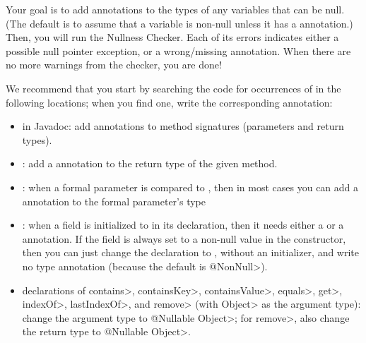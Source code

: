 Your goal is to add  annotations
to the types of any variables that can be null.  (The default is to assume
that a variable is non-null unless it has a  annotation.)
Then, you will run the Nullness Checker.  Each of its errors indicates
either a possible null pointer exception, or a wrong/missing annotation.
When there are no more warnings from the checker, you are done!

We recommend that you start by searching the code for occurrences of
 in the following locations; when you find one, write the
corresponding annotation:

\begin{itemize}
\item
  in Javadoc:  add  annotations to method signatures (parameters and return types).
\item
  :  add a  annotation to the return type
  of the given method.
\item
  :  when a formal parameter is compared to
  , then in most cases you can add a  annotation
  to the formal parameter's type
\item
  :  when a field is initialized to
   in its declaration, then it needs either a
   or a
   annotation.  If the field
  is always set to a non-null value in the constructor, then you can just
  change the declaration to , without an
  initializer, and write no type annotation (because the default is
  \<@NonNull>).
\item
  declarations of \<contains>, \<containsKey>, \<containsValue>, \<equals>,
  \<get>, \<indexOf>, \<lastIndexOf>, and \<remove> (with \<Object> as the
  argument type):
  change the argument type to \<@Nullable Object>; for \<remove>, also change
  the return type to \<@Nullable Object>.

\end{itemize}

